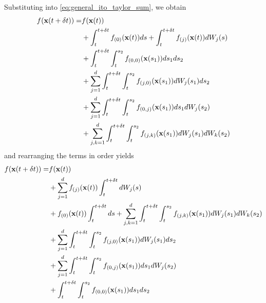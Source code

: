 %
Substituting into \eqref{eq:general_ito_taylor_sum}, we obtain
%
\begin{equation}
\begin{aligned}
f(\mathbf{x}(t+\delta t)) =&
f(\mathbf{x}(t)) \\
&+ \int_t^{t + \delta t} f_{(0)}(\mathbf{x}(t)) ds
+ \int_t^{t + \delta t} f_{(j)}(\mathbf{x}(t)) dW_j(s) \\
&+ \int_t^{t+\delta t} \int_t^{s_2} f_{(0,0)}(\mathbf{x}(s_1)) ds_1 ds_2 \\
&+ \sum_{j=1}^d \int_t^{t+\delta t} \int_t^{s_2} f_{(j,0)}(\mathbf{x}(s_1)) dW_j(s_1) ds_2 \\
&+ \sum_{j=1}^d \int_t^{t+\delta t} \int_t^{s_2} f_{(0,j)}(\mathbf{x}(s_1)) ds_1 dW_j(s_2) \\
&+ \sum_{j, k=1}^d \int_t^{t+\delta t} \int_t^{s_2} f_{(j,k)}(\mathbf{x}(s_1)) dW_j(s_1) dW_k(s_2)
\end{aligned}
\end{equation}
%
and rearranging the terms in order yields
%
\begin{equation} \label{eq:integro_f}
\begin{aligned}
f(\mathbf{x}(t+\delta t)) =&
f(\mathbf{x}(t)) \\
&+ \sum_{j=1}^d f_{(j)}(\mathbf{x}(t)) \int_t^{t + \delta t} dW_j(s) \\
&+  f_{(0)}(\mathbf{x}(t)) \int_t^{t + \delta t} ds
+ \sum_{j, k=1}^d \int_t^{t+\delta t} \int_t^{s_2} f_{(j,k)}(\mathbf{x}(s_1)) dW_j(s_1) dW_k(s_2) \\
&+ \sum_{j=1}^d \int_t^{t+\delta t} \int_t^{s_2} f_{(j,0)}(\mathbf{x}(s_1)) dW_j(s_1) ds_2 \\
&+ \sum_{j=1}^d \int_t^{t+\delta t} \int_t^{s_2} f_{(0,j)}(\mathbf{x}(s_1)) ds_1 dW_j(s_2) \\
&+ \int_t^{t+\delta t} \int_t^{s_2} f_{(0,0)}(\mathbf{x}(s_1)) ds_1 ds_2
\end{aligned}
\end{equation}


